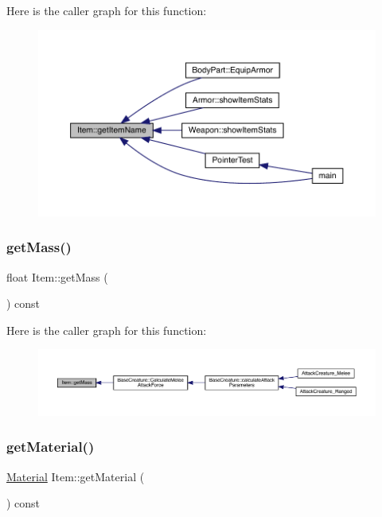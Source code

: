 Here is the caller graph for this function\+:
\nopagebreak
\begin{figure}[H]
\begin{center}
\leavevmode
\includegraphics[width=350pt]{dc/d32/class_item_a806159273f1f9fbb07fe75a74f2f51c5_icgraph}
\end{center}
\end{figure}
\mbox{\label{class_item_a452c0983b99f1b148949274b63ed79fd}} 
\subsubsection{\texorpdfstring{get\+Mass()}{getMass()}}
{\footnotesize\ttfamily float Item\+::get\+Mass (\begin{DoxyParamCaption}{ }\end{DoxyParamCaption}) const}

Here is the caller graph for this function\+:
\nopagebreak
\begin{figure}[H]
\begin{center}
\leavevmode
\includegraphics[width=350pt]{dc/d32/class_item_a452c0983b99f1b148949274b63ed79fd_icgraph}
\end{center}
\end{figure}
\mbox{\label{class_item_ada6692d4e0e9e8f9a9a78a13fd6522d8}} 
\subsubsection{\texorpdfstring{get\+Material()}{getMaterial()}}
{\footnotesize\ttfamily \mbox{\hyperlink{class_material}{Material}} Item\+::get\+Material (\begin{DoxyParamCaption}{ }\end{DoxyParamCaption}) const}

